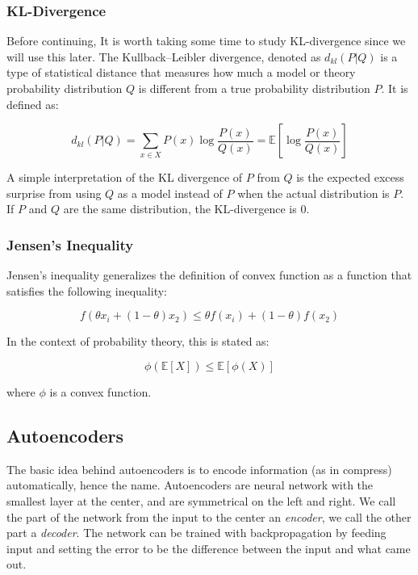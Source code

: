 \documentclass[11pt]{article}
\begin{document}
\subsubsection{KL-Divergence}\label{kl-divergence}

Before continuing, It is worth taking some time to study KL-divergence
since we will use this later. The Kullback--Leibler divergence, denoted
as \(d_{kl}(P|Q)\) is a type of statistical distance that measures how
much a model or theory probability distribution \(Q\) is different from
a true probability distribution \(P\). It is defined as:

\[d_{kl}(P|Q)=\sum_{x\in X}P(x)\log \frac{P(x)}{Q(x)}=\mathbb{E}[\log \frac{P(x)}{Q(x)}]\]

A simple interpretation of the KL divergence of \(P\) from \(Q\) is the
expected excess surprise from using \(Q\) as a model instead of \(P\)
when the actual distribution is \(P\). If \(P\) and \(Q\) are the same
distribution, the KL-divergence is \(0\).

\subsubsection{Jensen's Inequality}\label{jensens-inequality}

Jensen's inequality generalizes the definition of convex function as a
function that satisfies the following inequality:

\[f(\theta x_i + (1-\theta)x_2) \le \theta f(x_i)+(1-\theta)f(x_2)\]

In the context of probability theory, this is stated as:

\[\phi(\mathbb{E}[X])\le \mathbb{E}[\phi(X)]\]

where \(\phi\) is a convex function.

\subsection{Autoencoders}\label{autoencoders}

The basic idea behind autoencoders is to encode information (as in
compress) automatically, hence the name. Autoencoders are neural network
with the smallest layer at the center, and are symmetrical on the left
and right. We call the part of the network from the input to the center
an \emph{encoder}, we call the other part a \emph{decoder}. The network
can be trained with backpropagation by feeding input and setting the
error to be the difference between the input and what came out.
\end{document}
